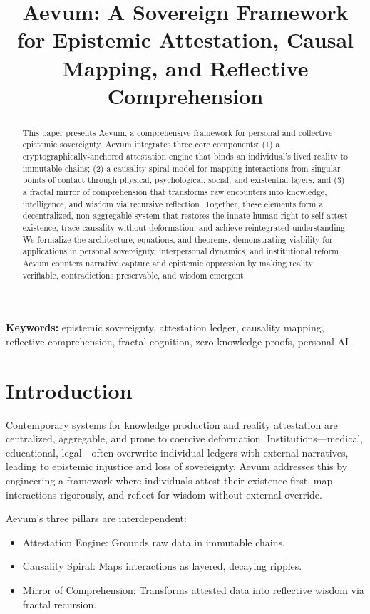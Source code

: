 \documentclass[11pt,a4paper]{article}
\title{\textbf{Aevum: A Sovereign Framework for Epistemic Attestation, Causal Mapping, and Reflective Comprehension}}
\author{}
\date{}
\theoremstyle{plain}
\begin{document}
\maketitle

\begin{abstract}
This paper presents Aevum, a comprehensive framework for personal and collective epistemic sovereignty. Aevum integrates three core components: (1) a cryptographically-anchored attestation engine that binds an individual's lived reality to immutable chains; (2) a causality spiral model for mapping interactions from singular points of contact through physical, psychological, social, and existential layers; and (3) a fractal mirror of comprehension that transforms raw encounters into knowledge, intelligence, and wisdom via recursive reflection. Together, these elements form a decentralized, non-aggregable system that restores the innate human right to self-attest existence, trace causality without deformation, and achieve reintegrated understanding. We formalize the architecture, equations, and theorems, demonstrating viability for applications in personal sovereignty, interpersonal dynamics, and institutional reform. Aevum counters narrative capture and epistemic oppression by making reality verifiable, contradictions preservable, and wisdom emergent.
\end{abstract}

\textbf{Keywords:} epistemic sovereignty, attestation ledger, causality mapping, reflective comprehension, fractal cognition, zero-knowledge proofs, personal AI

\section{Introduction}

Contemporary systems for knowledge production and reality attestation are centralized, aggregable, and prone to coercive deformation. Institutions---medical, educational, legal---often overwrite individual ledgers with external narratives, leading to epistemic injustice and loss of sovereignty. Aevum addresses this by engineering a framework where individuals attest their existence first, map interactions rigorously, and reflect for wisdom without external override.

Aevum's three pillars are interdependent:
\begin{itemize}
    \item Attestation Engine: Grounds raw data in immutable chains.
    \item Causality Spiral: Maps interactions as layered, decaying ripples.
    \item Mirror of Comprehension: Transforms attested data into reflective wisdom via fractal recursion.
\end{itemize}
\end{document}
